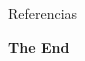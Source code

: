 \documentclass[aspectratio=169,xcolor=dvipsnames]{beamer}
\begin{document}

\begin{frame}[allowframebreaks]{Referencias}
    
    \footnotesize{
\printbibliography
    }
\end{frame}


\begin{frame}
    \Huge{\centerline{\textbf{The End}}}
\end{frame}

\end{document}
